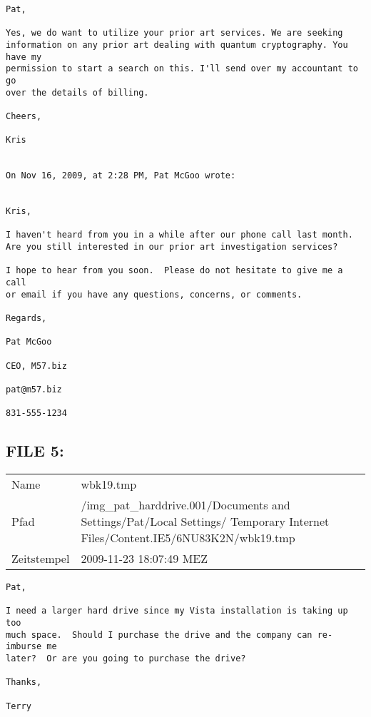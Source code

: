 \begin{lstlisting}
Pat,

Yes, we do want to utilize your prior art services. We are seeking 
information on any prior art dealing with quantum cryptography. You have my 
permission to start a search on this. I'll send over my accountant to go 
over the details of billing.

Cheers,

Kris


On Nov 16, 2009, at 2:28 PM, Pat McGoo wrote:


Kris,

I haven't heard from you in a while after our phone call last month. 
Are you still interested in our prior art investigation services?

I hope to hear from you soon.  Please do not hesitate to give me a call
or email if you have any questions, concerns, or comments.

Regards,

Pat McGoo

CEO, M57.biz

pat@m57.biz

831-555-1234

\end{lstlisting}
\newpage
\subsection{FILE 5:}

\begin{table}[htb]
	\begin{tabular}{p{2cm} p{13.5cm}}
		Name & wbk19.tmp\\
		Pfad & /img_pat_harddrive.001/Documents and Settings/Pat/Local Settings/ Temporary Internet Files/Content.IE5/6NU83K2N/wbk19.tmp\\
		Zeitstempel & 2009-11-23 18:07:49 MEZ
	\end{tabular}
\end{table}	

\begin{lstlisting}
Pat,

I need a larger hard drive since my Vista installation is taking up too 
much space.  Should I purchase the drive and the company can re-imburse me 
later?  Or are you going to purchase the drive?

Thanks,

Terry

\end{lstlisting}

